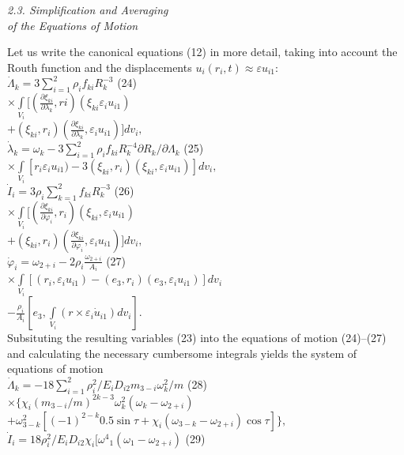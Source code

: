 \documentclass[fontsize = 11pt,a4paper]{article}
\begin{document}
\begin{multicols}{2}
\centerline{\emph{2.3. Simplification and Averaging\\
of the Equations of Motion}}
Let us write the canonical equations (12) in more
detail, taking into account the Routh function and the
displacements $u_i(r_i, t) \approx \varepsilon u_{i1}:$\\
$\dot\Lambda_k = 3  \sum\limits_{i=1}^{2} \rho_i f_{ki} R^{-3}_k$ \hfill (24) \\
$ \times \int\limits_{V_i}[(\frac{\partial{\xi_{ki}}}{\partial{\lambda_k}},ri)(\xi_{ki} \varepsilon_i u_{i1})$\\
$+ (\xi_{ki}, r_i) (\frac{\partial{\xi_{ki}}}{\partial{\lambda_k}}, \varepsilon_i u_{i1})] dv_i,$\\
$\dot\lambda_k  = \omega_k - 3 \sum\limits_{i=1}^{2} \rho_i f_{ki} R^{-4}_k \partial R_k / \partial \Lambda _k$ \hfill (25)\\
$ \times  \int\limits_{V_i} [ r_i \varepsilon_i u_{i1}) - 3(\xi_{ki}, r_i)(\xi_{ki},\varepsilon_i u_{i1})] d v_i,$ \\
$\dot I_i = 3 \rho_i \sum\limits_{k=1}^{2}  f_{ki} R^{-3}_k $ \hfill (26) \\
$ \times  \int\limits_{V_i} [(\frac{\partial{\xi_{ki}}}{\partial{\varphi_i}}, r_i)(\xi_{ki}, \varepsilon_i u_{i1})$ \\
$ + ( \xi_{ki}, r_i) (\frac{\partial{\xi_{ki}}}{\partial{\varphi_i}},  \varepsilon_i u_{i1})]  d v_i,$ \\
$\dot \varphi_i = \omega_{2 + i} - 2 {\rho_i} \frac{\omega_{2 + i}}{A_i}$ \hfill (27) \\
$\times \int\limits_{V_i}[ (r_i,  \varepsilon_i u_{i1}) - (e_3,r_i)(e_3, \varepsilon_i u_{i1})] d v_i$ \\
$- \frac{\rho_i}{A_i}[e_3,\int\limits_{V_i}(r \times \varepsilon_i  \dot u_{i1})d v_i].$\\
Subsituting the resulting variables (23) into the
equations of motion (24)–(27) and calculating the
necessary cumbersome integrals yields the system of
equations of motion\\
$\dot\Lambda_k  = -18 \sum\limits_{i=1}^{2} \rho ^2_i / E_i D_{i2} m_{3-i} \omega^2_k / m$ \hfill (28) \\
$\times \{ \chi_i {(m_{3-i}/m)}^{2k-3} \omega^2_k(\omega_k - \omega_{2+i})$\\
$+ \omega^2_{3-k}[(-1)^{2-k}0.5 \sin \tau + \chi_i ( \omega_{3-k} -  \omega_{2+i}) \cos \tau] \},$\\
$\dot I_i = 18 \rho^2_i / E_i D_{i2} \chi_i[ {\omega^4}_1(\omega_1 - \omega_{2 + i})$ \hfill (29) \\

\end{multicols}
\end{document}
